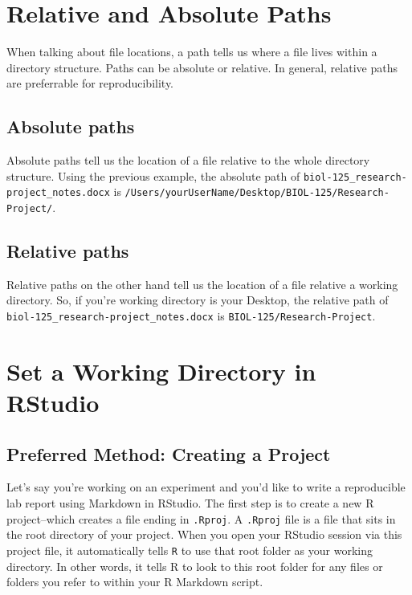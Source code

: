 \documentclass[
]{book}
\begin{document}
\section{Relative and Absolute Paths}\label{relative-and-absolute-paths}

When talking about file locations, a path tells us where a file lives within a directory structure. Paths can be absolute or relative. In general, relative paths are preferrable for reproducibility.

\subsection*{Absolute paths}\label{absolute-paths}

Absolute paths tell us the location of a file relative to the whole directory structure. Using the previous example, the absolute path of \texttt{biol-125\_research-project\_notes.docx} is \texttt{/Users/yourUserName/Desktop/BIOL-125/Research-Project/}.

\subsection*{Relative paths}\label{relative-paths}

Relative paths on the other hand tell us the location of a file relative a working directory. So, if you're working directory is your Desktop, the relative path of \texttt{biol-125\_research-project\_notes.docx} is \texttt{BIOL-125/Research-Project}.

\section{Set a Working Directory in RStudio}\label{set-a-working-directory-in-rstudio}

\subsection*{Preferred Method: Creating a Project}\label{preferred-method-creating-a-project}

Let's say you're working on an experiment and you'd like to write a reproducible lab report using Markdown in RStudio. The first step is to create a new R project--which creates a file ending in \texttt{.Rproj}. A \texttt{.Rproj} file is a file that sits in the root directory of your project. When you open your RStudio session via this project file, it automatically tells \texttt{R} to use that root folder as your working directory. In other words, it tells R to look to this root folder for any files or folders you refer to within your R Markdown script.
\end{document}

